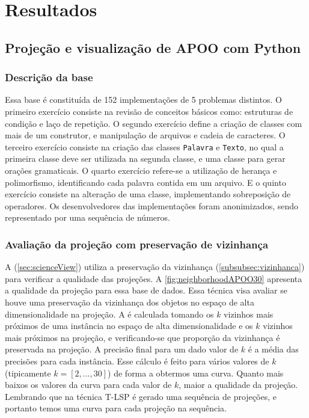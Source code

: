 \chapter{Resultados}
\label{chap:resultados}

	\section{Projeção e visualização de APOO com Python}
	
	\subsection{Descrição da base}
		Essa base é constituída de 152 implementações de 5 problemas distintos. O primeiro exercício
		consiste na revisão de conceitos básicos como: estruturas de condição e laço de repetição. O
		segundo exercício define a criação de classes com mais de um construtor, e manipulação de
		arquivos e cadeia de caracteres. O terceiro exercício consiste na criação das classes
		\texttt{Palavra} e \texttt{Texto}, no qual a primeira classe deve ser utilizada na segunda
		classe, e uma classe para gerar orações gramaticais. O quarto exercício refere-se a
		utilização de herança e polimorfismo, identificando cada palavra contida em um arquivo. E
		o quinto exercício consiste na alteração de uma classe, implementando sobreposição de
		operadores. Os desenvolvedores das implementações foram anonimizados, sendo representado
		por uma sequência de números.
	
	\subsection{Avaliação da projeção com preservação de vizinhança}
	A  (\cref{sec:scienceView}) utiliza a preservação da vizinhança
	(\cref{subsubsec:vizinhanca}) para verificar a qualidade das projeções. A \cref{fig:neighborhoodAPOO30}
	apresenta a qualidade da projeção para essa base de dados. Essa técnica visa avaliar
	se houve uma preservação da vizinhança dos objetos no espaço de alta dimensionalidade
	na projeção. A  é calculada tomando os $k$ vizinhos
	mais próximos de uma instância no espaço de alta dimensionalidade e os $k$ vizinhos
	mais próximos na projeção, e verificando-se que proporção da vizinhança é preservada
	na projeção. A precisão final para um dado valor de $k$ é a média das precisões para
	cada instância. Esse cálculo é feito para vários valores de $k$ (tipicamente $k=[2,...,30]$)
	de forma a obtermos uma curva. Quanto mais baixos os valores da curva para cada valor
	de $k$, maior a qualidade da projeção. Lembrando que na técnica \acl{T-LSP} \cite{Alencar}
	é gerado uma sequência de projeções, e portanto temos uma curva para cada projeção na
	sequência.
	

